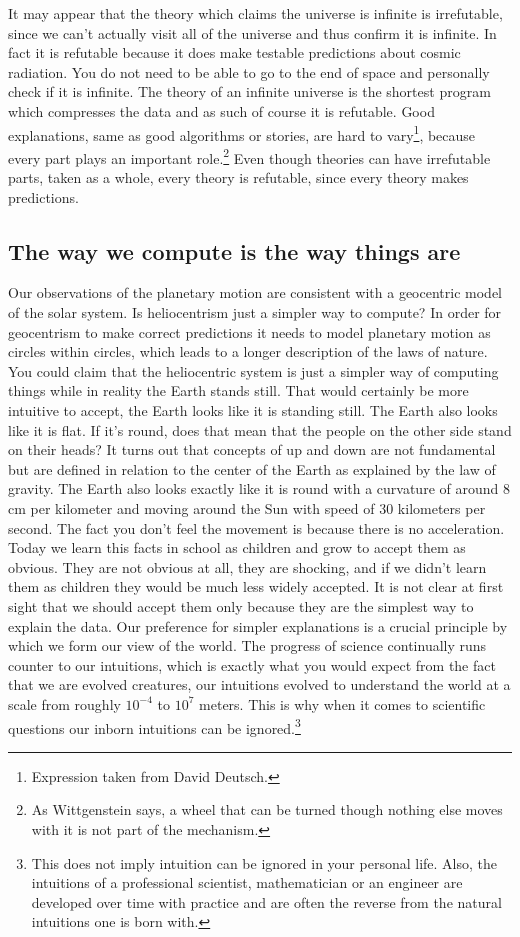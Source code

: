 It may appear that the theory which claims the universe is infinite is irrefutable, since we can't actually visit all of the universe and thus confirm it is infinite.
In fact it is refutable because it does make testable predictions about cosmic radiation.
You do not need to be able to go to the end of space and personally check if it is infinite.
The theory of an infinite universe is the shortest program which compresses the data and as such of course it is refutable.
Good explanations, same as good algorithms or stories, are hard to vary\footnote{Expression taken from David Deutsch.}, because every part plays an important role.\footnote{As Wittgenstein says, a wheel that can be turned though nothing else moves with it is not part of the mechanism.}
Even though theories can have irrefutable parts, taken as a whole, every theory is refutable, since every theory makes predictions.

\newpage

\subsection{The way we compute is the way things are}

Our observations of the planetary motion are consistent with a geocentric model of the solar system.
Is heliocentrism just a simpler way to compute?
In order for geocentrism to make correct predictions it needs to model planetary motion as circles within circles, which leads to a longer description of the laws of nature.
You could claim that the heliocentric system is just a simpler way of computing things while in reality the Earth stands still.
That would certainly be more intuitive to accept, the Earth looks like it is standing still.
The Earth also looks like it is flat.
If it's round, does that mean that the people on the other side stand on their heads?
It turns out that concepts of up and down are not fundamental but are defined in relation to the center of the Earth as explained by the law of gravity.
The Earth also looks exactly like it is round with a curvature of around 8 cm per kilometer and moving around the Sun with speed of 30 kilometers per second.
The fact you don't feel the movement is because there is no acceleration.
Today we learn this facts in school as children and grow to accept them as obvious.
They are not obvious at all, they are shocking, and if we didn't learn them as children they would be much less widely accepted.
It is not clear at first sight that we should accept them only because they are the simplest way to explain the data.
Our preference for simpler explanations is a crucial principle by which we form our view of the world.
The progress of science continually runs counter to our intuitions, which is exactly what you would expect from the fact that we are evolved creatures, our intuitions evolved to understand the world at a scale from roughly $10^{-4}$ to $10^7$ meters.
This is why when it comes to scientific questions our inborn intuitions can be ignored.\footnote{
This does not imply intuition can be ignored in your personal life.
Also, the intuitions of a professional scientist, mathematician or an engineer are developed over time with practice and are often the reverse from the natural intuitions one is born with.
}

